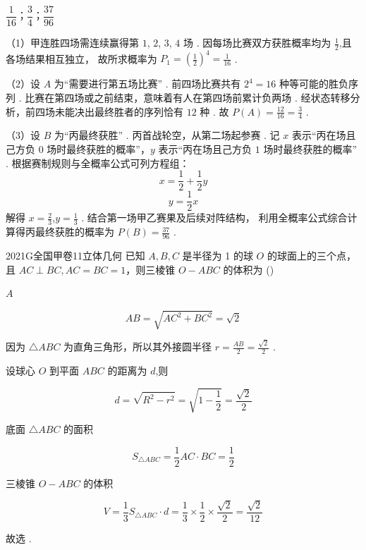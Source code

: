 \documentclass[12pt,UTF-8,a4paper]{ctexart}
\numberwithin{figure}{section}
\theoremstyle{mystyle}
\theoremstyle{mystylekaishu}
\theoremstyle{mystyle}
\numberwithin{xiti}{section}
\begin{document}
\begin{answer}
$\dfrac{1}{16}；\dfrac{3}{4}；\dfrac{37}{96}$
\end{answer}

\begin{solutions}
（1）甲连胜四场需连续赢得第 $1$, $2$, $3$, $4$ 场 .
因每场比赛双方获胜概率均为 $\displaystyle \frac{1}{2}$,且各场结果相互独立，
故所求概率为 $P_1 = \left(\displaystyle \frac{1}{2}\right)^4 = \displaystyle \frac{1}{16}$ .

（2）设 $A$ 为“需要进行第五场比赛” .
前四场比赛共有 $2^4 = 16$ 种等可能的胜负序列 .
比赛在第四场或之前结束，意味着有人在第四场前累计负两场 .
经状态转移分析，前四场未能决出最终胜者的序列恰有 $12$ 种 .
故 $P(A) = \displaystyle \frac{12}{16} = \displaystyle \frac{3}{4}$ .

（3）设 $B$ 为“丙最终获胜” .
丙首战轮空，从第二场起参赛 .
记 $x$ 表示“丙在场且己方负 $0$ 场时最终获胜的概率”，$y$ 表示“丙在场且己方负 $1$ 场时最终获胜的概率” .
根据赛制规则与全概率公式可列方程组：
$$
x = \displaystyle \frac{1}{2} + \displaystyle \frac{1}{2} y
$$
$$
y = \displaystyle \frac{1}{2} x
$$
解得 $x = \displaystyle \frac{2}{3}$,$y = \displaystyle \frac{1}{3}$ .
结合第一场甲乙赛果及后续对阵结构，
利用全概率公式综合计算得丙最终获胜的概率为 $P(B) = \displaystyle \frac{37}{96}$ .
\end{solutions}


\begin{problem}{2021}{G}{全国甲卷}{11}{立体几何}
已知 $A, B, C$ 是半径为 1 的球 $O$ 的球面上的三个点，且 $AC \perp BC, AC=BC=1$，则三棱锥 $O-ABC$ 的体积为 (\hspace{1cm})
\begin{choices}
\end{choices}
\end{problem}

\begin{answer}
$A$
\end{answer}

\begin{solutions}
$$
AB = \sqrt{AC^2 + BC^2} = \sqrt{2}
$$

因为 $\triangle ABC$ 为直角三角形，所以其外接圆半径 $r = \frac{AB}{2} = \frac{\sqrt{2}}{2}$ .

设球心 $O$ 到平面 $ABC$ 的距离为 $d$,则

$$
d = \sqrt{R^2 - r^2} = \sqrt{1 - \frac{1}{2}} = \frac{\sqrt{2}}{2}
$$

底面 $\triangle ABC$ 的面积

$$
S_{\triangle ABC} = \frac{1}{2} AC \cdot BC = \frac{1}{2}
$$

三棱锥 $O-ABC$ 的体积

$$
V = \frac{1}{3} S_{\triangle ABC} \cdot d = \frac{1}{3} \times \frac{1}{2} \times \frac{\sqrt{2}}{2} = \frac{\sqrt{2}}{12}
$$

故选  .
\end{solutions}
\end{document}
